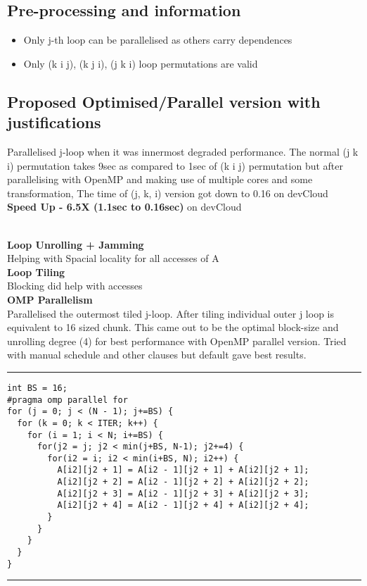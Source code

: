\documentclass[a4paper]{article}
\begin{document}
\subsection{Pre-processing and information}
\begin{itemize}
\item Only j-th loop can be parallelised as others carry dependences
\item Only (k i j), (k j i), (j k i) loop permutations are valid
\end{itemize}


\subsection{Proposed Optimised/Parallel version with justifications}
Parallelised j-loop when it was innermost degraded performance. The normal (j k i) permutation takes 9sec as compared to 1sec of (k i j) permutation but after parallelising with OpenMP and making use of multiple cores and some transformation, The time of (j, k, i) version got down to 0.16 on devCloud \\ {\bf Speed Up - 6.5X (1.1sec to 0.16sec)} on devCloud \\ \\
\begin{minipage}{0.3\textwidth}

{\bf Loop Unrolling + Jamming} \\
Helping with Spacial locality for all accesses of A \\ 

{\bf Loop Tiling} \\
Blocking did help with accesses \\ 

{\bf OMP Parallelism} \\
Parallelised the outermost tiled j-loop. After tiling individual outer j loop is equivalent to 16 sized chunk. This came out to be the optimal block-size and unrolling degree (4) for best performance with OpenMP parallel version. Tried with manual schedule and other clauses but default gave best results.


\end{minipage}
\begin{minipage}{0.7\textwidth}
\hrule
\begin{lstlisting}
int BS = 16;
#pragma omp parallel for
for (j = 0; j < (N - 1); j+=BS) {
  for (k = 0; k < ITER; k++) {
    for (i = 1; i < N; i+=BS) {
      for(j2 = j; j2 < min(j+BS, N-1); j2+=4) {
        for(i2 = i; i2 < min(i+BS, N); i2++) {
          A[i2][j2 + 1] = A[i2 - 1][j2 + 1] + A[i2][j2 + 1];
          A[i2][j2 + 2] = A[i2 - 1][j2 + 2] + A[i2][j2 + 2];
          A[i2][j2 + 3] = A[i2 - 1][j2 + 3] + A[i2][j2 + 3];
          A[i2][j2 + 4] = A[i2 - 1][j2 + 4] + A[i2][j2 + 4];
        }
      }
    }
  }
}
\end{lstlisting}
\hrule 
\end{minipage}
\end{document}
